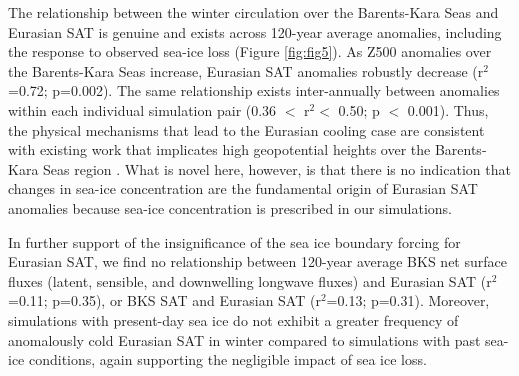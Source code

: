 \documentclass{nature}
\begin{document}
The relationship between the winter circulation over the Barents-Kara Seas and Eurasian SAT is genuine and exists across 120-year average anomalies, including the response to observed sea-ice loss (Figure \ref{fig:fig5}). As Z500 anomalies over the Barents-Kara Seas increase, Eurasian SAT anomalies robustly decrease (r$^2$=0.72; p=0.002). The same relationship exists inter-annually between anomalies within each individual simulation pair (0.36 $<$ r$^2<$ 0.50; p $<$ 0.001). Thus, the physical mechanisms that lead to the Eurasian cooling case are consistent with existing work that implicates high geopotential heights over the Barents-Kara Seas region \cite{honda09,petoukhov10,mori14}. What is novel here, however, is that there is no indication that changes in sea-ice concentration are the fundamental origin of Eurasian SAT anomalies because sea-ice concentration is prescribed in our simulations. %


In further support of the insignificance of the sea ice boundary forcing for Eurasian SAT, we find no relationship between 120-year average BKS net surface fluxes (latent, sensible, and downwelling longwave fluxes) and Eurasian SAT (r$^2$=0.11; p=0.35), or BKS SAT and Eurasian SAT (r$^2$=0.13; p=0.31). Moreover, simulations with present-day sea ice do not exhibit a greater frequency of anomalously cold Eurasian SAT in winter compared to simulations with past sea-ice conditions, again supporting the negligible impact of sea ice loss. 

\end{document}
